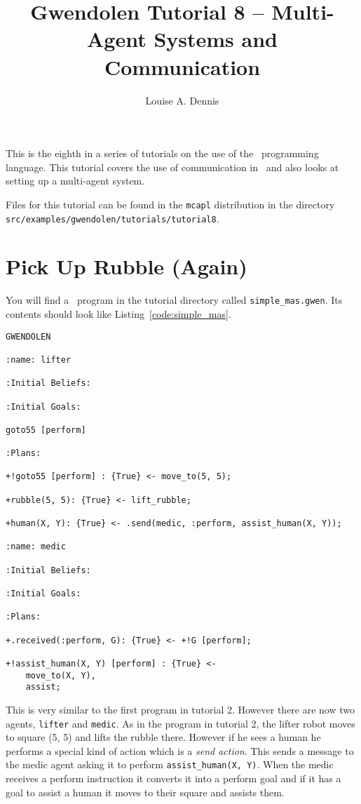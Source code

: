 \documentclass[a4]{article}
\author{Louise A. Dennis}
\title{Gwendolen Tutorial 8 -- Multi-Agent Systems and Communication}
\begin{document}
\maketitle
This is the eighth in a series of tutorials on the use of the \gwendolen\ programming language.  This tutorial covers the use of communication in \gwendolen\ and also looks at setting up a multi-agent system.

Files for this tutorial can be found in the \texttt{mcapl} distribution in the directory \texttt{src/examples/gwendolen/tutorials/tutorial8}.

\section{Pick Up Rubble (Again)}

\begin{sloppypar}
You will find a \gwendolen\ program in the tutorial directory called \texttt{simple\_mas.gwen}.  Its contents should look like Listing~\ref{code:simple_mas}.
\end{sloppypar}
\begin{lstlisting}[float,caption=Simple Multi-Agent System,basicstyle=\sffamily,style=easslisting,language=Gwendolen,label=code:simple_mas]
GWENDOLEN

:name: lifter

:Initial Beliefs:

:Initial Goals:

goto55 [perform]

:Plans:

+!goto55 [perform] : {True} <- move_to(5, 5);

+rubble(5, 5): {True} <- lift_rubble;

+human(X, Y): {True} <- .send(medic, :perform, assist_human(X, Y));

:name: medic

:Initial Beliefs:

:Initial Goals:

:Plans:

+.received(:perform, G): {True} <- +!G [perform];

+!assist_human(X, Y) [perform] : {True} <- 
	move_to(X, Y),
	assist;
\end{lstlisting}

This is very similar to the first program in tutorial 2.  However  there are now two agents, \texttt{lifter} and \texttt{medic}.  As in the program in tutorial 2, the lifter robot moves to square (5, 5) and lifts the rubble there.  However if he sees a human he performs a special kind of action which is a \emph{send action}.  This sends a message to the medic agent asking it to perform \texttt{assist\_human(X, Y)}.  When the medic receives a perform instruction it converts it into a perform goal and if it has a goal to assist a human it moves to their square and assists them.
\end{document}
